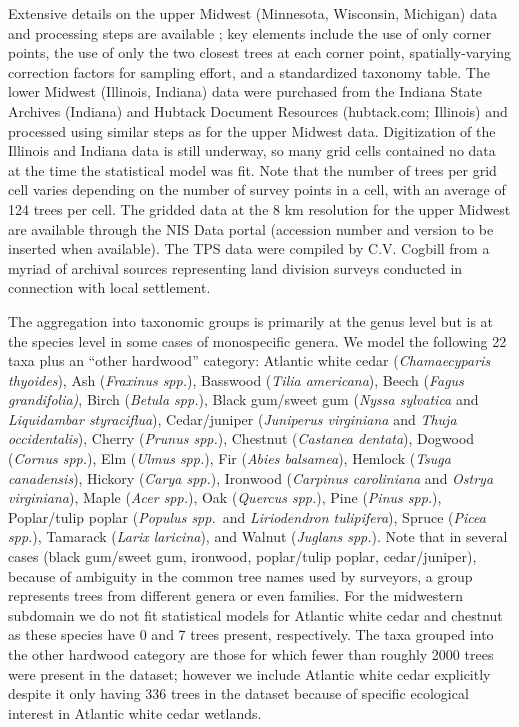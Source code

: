 \documentclass[10pt,letterpaper]{article}
\begin{document}
Extensive details on the upper Midwest (Minnesota, Wisconsin, Michigan)
data and processing steps are available \cite{goring2015composition};
key elements include the use of only corner points, the use of only
the two closest trees at each corner point, spatially-varying correction
factors for sampling effort, and a standardized taxonomy table. The
lower Midwest (Illinois, Indiana) data were purchased from the Indiana
State Archives (Indiana) and Hubtack Document Resources (hubtack.com;
Illinois) and processed using similar steps as for the upper Midwest
data. Digitization of the Illinois and Indiana data is still underway,
so many grid cells contained no data at the time the statistical model
was fit. Note that the number of trees per grid cell varies depending
on the number of survey points in a cell, with an average of 124 trees
per cell. The gridded data at the 8 km resolution for the upper Midwest
are available through the NIS Data portal (accession number and version
to be inserted when available). The TPS data were compiled by C.V.
Cogbill from a myriad of archival sources representing land division
surveys conducted in connection with local settlement. 

The aggregation into taxonomic groups is primarily at the genus level
but is at the species level in some cases of monospecific genera.
We model the following 22 taxa plus an ``other hardwood'' category:
Atlantic white cedar (\emph{Chamaecyparis thyoides}), Ash (\emph{Fraxinus
spp.}), Basswood (\emph{Tilia americana}), Beech (\emph{Fagus grandifolia)},
Birch (\emph{Betula spp.}), Black gum/sweet gum (\emph{Nyssa sylvatica}
and \emph{Liquidambar styraciflua}), Cedar/juniper (\emph{Juniperus
virginiana} and \emph{Thuja occidentalis}), Cherry (\emph{Prunus spp.}),
Chestnut (\emph{Castanea dentata}), Dogwood (\emph{Cornus spp.}),
Elm (\emph{Ulmus spp.}), Fir (\emph{Abies balsamea}), Hemlock (\emph{Tsuga
canadensis}), Hickory (\emph{Carya spp.}), Ironwood (\emph{Carpinus
caroliniana} and \emph{Ostrya virginiana}), Maple (\emph{Acer spp.}),
Oak (\emph{Quercus spp.}), Pine (\emph{Pinus spp.}), Poplar/tulip
poplar (\emph{Populus spp.}~and \emph{Liriodendron tulipifera}),
Spruce (\emph{Picea spp.}), Tamarack (\emph{Larix laricina}), and
Walnut (\emph{Juglans spp.}). Note that in several cases (black gum/sweet
gum, ironwood, poplar/tulip poplar, cedar/juniper), because of ambiguity
in the common tree names used by surveyors, a group represents trees
from different genera or even families. For the midwestern subdomain
we do not fit statistical models for Atlantic white cedar and chestnut
as these species have 0 and 7 trees present, respectively. The taxa
grouped into the other hardwood category are those for which fewer
than roughly 2000 trees were present in the dataset; however we include
Atlantic white cedar explicitly despite it only having 336 trees in
the dataset because of specific ecological interest in Atlantic white
cedar wetlands. 
\end{document}
